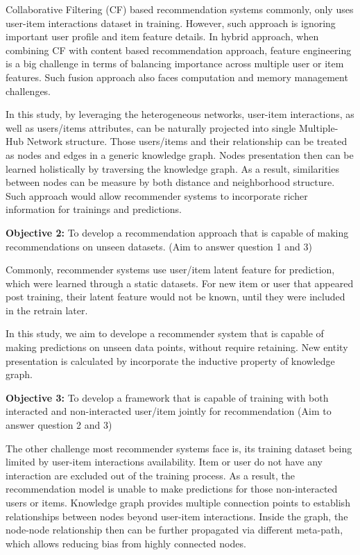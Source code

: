 Collaborative Filtering (CF) based recommendation systems commonly, only uses user-item interactions dataset in training. However, such approach is ignoring important user profile and item feature details. In hybrid approach, when combining CF with content based recommendation approach, feature engineering is a big challenge in terms of balancing importance across multiple user or item features. Such fusion approach also faces computation and memory management challenges. 

In this study, by leveraging the heterogeneous networks, user-item interactions, as well as users/items attributes, can be naturally projected into single Multiple-Hub Network \citep{Shi2017} structure. Those users/items and their relationship can be treated as nodes and edges in a generic knowledge graph. Nodes presentation then can be learned holistically by traversing the knowledge graph. As a result, similarities between nodes can be measure by both distance and neighborhood structure. Such approach would allow recommender systems to incorporate richer information for trainings and predictions.

\bigskip
\textbf{Objective 2:} To develop a recommendation approach that is capable of making recommendations on unseen datasets. (Aim to answer question 1 and 3)

Commonly, recommender systems use user/item latent feature for prediction, which were learned through a static datasets. For new item or user that appeared post training, their latent feature would not be known, until they were included in the retrain later.

In this study, we aim to develope a recommender system that is capable of making predictions on unseen data points, without require retaining. New entity presentation is calculated by incorporate the inductive property of knowledge graph.

\bigskip
\textbf{Objective 3:} To develop a framework that is capable of training with both interacted and non-interacted user/item jointly for recommendation (Aim to answer question 2 and 3)

The other challenge most recommender systems face is, its training dataset being limited by user-item interactions availability. Item or user do not have any interaction are excluded out of the training process. As a result, the recommendation model is unable to make predictions for those non-interacted users or items.
Knowledge graph provides multiple connection points to establish relationships between nodes beyond user-item interactions. Inside the graph, the node-node relationship then can be further propagated via different meta-path, which allows reducing bias from highly connected nodes. 


